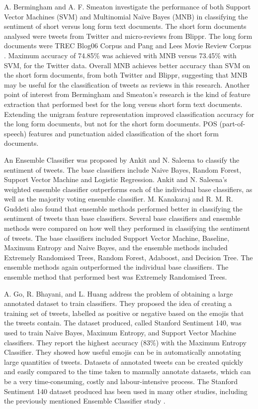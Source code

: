 A. Bermingham and A. F. Smeaton \cite{Berm2010} investigate the performance of both Support Vector Machines (SVM) and Multinomial Naïve Bayes (MNB) in classifying the sentiment of short versus long form text documents. The short form documents analysed were tweets from Twitter and micro-reviews from Blippr. The long form documents were TREC Blog06 Corpus and Pang and Lees Movie Review Corpus \cite{panglee2004}. Maximum accuracy of 74.85\% was achieved with MNB versus 73.45\% with SVM, for the Twitter data. Overall MNB achieves better accuracy than SVM on the short form documents, from both Twitter and Blippr, suggesting that MNB may be useful for the classification of tweets as reviews in this research. Another point of interest from Bermingham and Smeaton's research is the kind of feature extraction that performed best for the long versus short form text documents. Extending the unigram feature representation improved classification accuracy for the long form documents, but not for the short form documents. POS (part-of-speech) features and punctuation aided classification of the short form documents.

An Ensemble Classifier was proposed by Ankit and N. Saleena \cite{Ankit2018} to classify the sentiment of tweets. The base classifiers include Naive Bayes, Random Forest, Support Vector Machine and Logistic Regression. Ankit and N. Saleena's weighted ensemble classifier outperforms each of the individual base classifiers, as well as the majority voting ensemble classifier. M. Kanakaraj and R. M. R. Guddeti \cite{Kanakaraj2015} also found that ensemble methods performed better in classifying the sentiment of tweets than base classifiers. Several base classifiers and ensemble methods were compared on how well they performed in classifying the sentiment of tweets. The base classifiers included Support Vector Machine, Baseline, Maximum Entropy and Naive Bayes, and the ensemble methods included Extremely Randomised Trees, Random Forest, Adaboost, and Decision Tree. The ensemble methods again outperformed the individual base classifiers. The ensemble method that performed best was Extremely Randomised Trees.

A. Go, R. Bhayani, and L. Huang \cite{Go2009} address the problem of obtaining a large annotated dataset to train classifiers. They proposed the idea of creating a training set of tweets, labelled as positive or negative based on the emojis that the tweets contain. The dataset produced, called Stanford Sentiment 140, was used to train Naive Bayes, Maximum Entropy, and Support Vector Machine classifiers. They report the highest accuracy (83\%) with the Maximum Entropy Classifier. They showed how useful emojis can be in automatically annotating large quantities of tweets. Datasets of annotated tweets can be created quickly and easily compared to the time taken to manually annotate datasets, which can be a very time-consuming, costly and labour-intensive process. The Stanford Sentiment 140 dataset produced has been used in many other studies, including the previously mentioned Ensemble Classifier study \cite{Ankit2018}.

